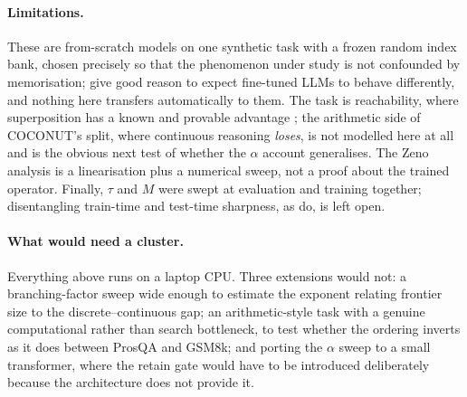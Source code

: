 \documentclass[11pt]{article}
\theoremstyle{definition}
\begin{document}
\paragraph{Limitations.} These are from-scratch models on one synthetic task with a
frozen random index bank, chosen precisely so that the phenomenon under study is not
confounded by memorisation; \citet{rizvimartel2026illusion} give good reason to expect
fine-tuned LLMs to behave differently, and nothing here transfers automatically to
them. The task is reachability, where superposition has a known and provable advantage
\citep{zhu2025superposition}; the arithmetic side of COCONUT's split, where continuous
reasoning \emph{loses}, is not modelled here at all and is the obvious next test of
whether the $\alpha$ account generalises. The Zeno analysis is a linearisation plus a
numerical sweep, not a proof about the trained operator. Finally, $\tau$ and $M$ were
swept at evaluation and training together; disentangling train-time and test-time
sharpness, as \citet{butt2025softtokens} do, is left open.

\paragraph{What would need a cluster.} Everything above runs on a laptop CPU. Three
extensions would not: a branching-factor sweep wide enough to estimate the exponent
relating frontier size to the discrete--continuous gap; an arithmetic-style task with
a genuine computational rather than search bottleneck, to test whether the ordering
inverts as it does between ProsQA and GSM8k; and porting the $\alpha$ sweep to a small
transformer, where the retain gate would have to be introduced deliberately because
the architecture does not provide it.


\end{document}
